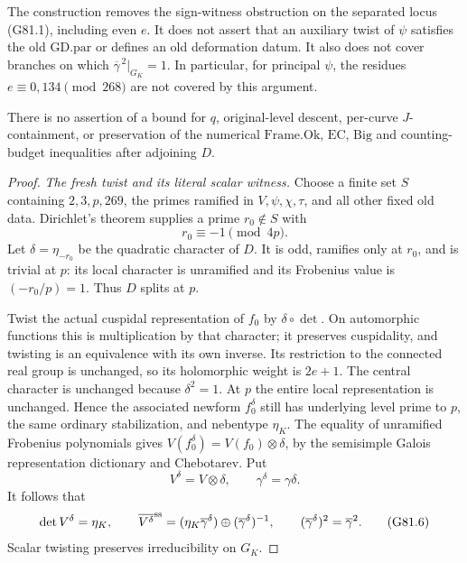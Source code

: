 \begin{theorem}
The construction removes the sign-witness obstruction on the
separated locus (G81.1), including even \(e\).  It does not assert
that an auxiliary twist of \(\psi\) satisfies the old
\(\mathrm{GD.par}\) or defines an old deformation datum.
It also does not cover branches on which
\(\overline\gamma^{\,2}|_{G_K}=1\).  In particular, for principal
\(\psi\), the residues \(e\equiv0,134\pmod{268}\) are not covered
by this argument.

There is no assertion of a bound for \(q\), original-level
descent, per-curve \(J\)-containment, or preservation of the
numerical \(\mathrm{Frame.Ok}\), \(\mathrm{EC}\), \(\mathrm{Big}\)
and counting-budget inequalities after adjoining \(D\).
\end{theorem}

\begin{proof}
\emph{The fresh twist and its literal scalar witness.}
Choose a finite set \(S\) containing \(2,3,p,269\), the primes
ramified in \(V,\psi,\chi,\tau\), and all other fixed old data.
Dirichlet's theorem supplies a prime \(r_0\notin S\) with
\[
                         r_0\equiv-1\pmod{4p}.
                                                        \tag{G81.5}
\]
Let \(\delta=\eta_{-r_0}\) be the quadratic character of \(D\).
It is odd, ramifies only at \(r_0\), and is trivial at \(p\):
its local character is unramified and its Frobenius value is
\(({-r_0}/p)=1\).  Thus \(D\) splits at \(p\).

Twist the actual cuspidal representation of \(f_0\) by
\(\delta\circ\det\).  On automorphic functions this is
multiplication by that character; it preserves cuspidality,
and twisting is an equivalence with its own inverse.
Its restriction to the connected real group is unchanged, so
its holomorphic weight is \(2e+1\).  The central character is
unchanged because \(\delta^2=1\).  At \(p\) the entire local
representation is unchanged.  Hence the associated newform
\(f_0^\delta\) still has underlying level prime to \(p\), the
same ordinary stabilization, and nebentype \(\eta_K\).
The equality of unramified Frobenius polynomials gives
\(V(f_0^\delta)=V(f_0)\otimes\delta\), by the semisimple
Galois representation dictionary and Chebotarev.
Put
\[
 V^\delta=V\otimes\delta,\qquad
 \gamma^\delta=\gamma\delta.
\]
It follows that
\[
 \det V^\delta=\eta_K,\qquad
 \overline{V^\delta}^{\rm ss}
   =(\eta_K\overline\gamma^\delta)
      \oplus(\overline\gamma^\delta)^{-1},\qquad
 (\overline\gamma^\delta)^2=\overline\gamma^2.      \tag{G81.6}
\]
Scalar twisting preserves irreducibility on \(G_K\).


\end{proof}
